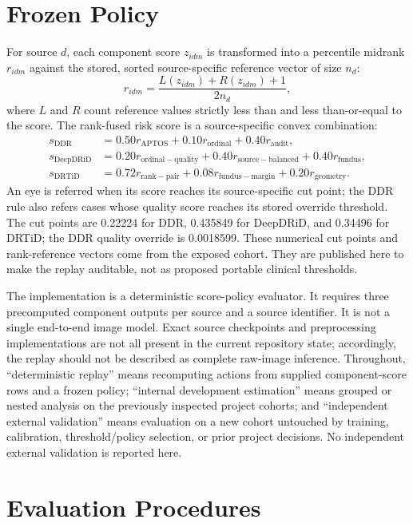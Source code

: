 \documentclass[11pt]{article}
\begin{document}
\section{Frozen Policy}
For source $d$, each component score $z_{idm}$ is transformed into a percentile midrank $r_{idm}$ against the stored, sorted source-specific reference vector of size $n_d$:
\begin{equation}
r_{idm}=\frac{L(z_{idm})+R(z_{idm})+1}{2n_d},
\end{equation}
where $L$ and $R$ count reference values strictly less than and less than-or-equal to the score. The rank-fused risk score is a source-specific convex combination:
\begin{align}
s_{\mathrm{DDR}}&=0.50r_{\mathrm{APTOS}}+0.10r_{\mathrm{ordinal}}+0.40r_{\mathrm{audit}},\\
s_{\mathrm{DeepDRiD}}&=0.20r_{\mathrm{ordinal-quality}}+0.40r_{\mathrm{source-balanced}}+0.40r_{\mathrm{fundus}},\\
s_{\mathrm{DRTiD}}&=0.72r_{\mathrm{rank-pair}}+0.08r_{\mathrm{fundus-margin}}+0.20r_{\mathrm{geometry}}.
\end{align}
An eye is referred when its score reaches its source-specific cut point; the DDR rule also refers cases whose quality score reaches its stored override threshold. The cut points are 0.22224 for DDR, 0.435849 for DeepDRiD, and 0.34496 for DRTiD; the DDR quality override is 0.0018599. These numerical cut points and rank-reference vectors come from the exposed cohort. They are published here to make the replay auditable, not as proposed portable clinical thresholds.

The implementation is a deterministic score-policy evaluator. It requires three precomputed component outputs per source and a source identifier. It is not a single end-to-end image model. Exact source checkpoints and preprocessing implementations are not all present in the current repository state; accordingly, the replay should not be described as complete raw-image inference. Throughout, ``deterministic replay'' means recomputing actions from supplied component-score rows and a frozen policy; ``internal development estimation'' means grouped or nested analysis on the previously inspected project cohorts; and ``independent external validation'' means evaluation on a new cohort untouched by training, calibration, threshold/policy selection, or prior project decisions. No independent external validation is reported here.

\section{Evaluation Procedures}
\end{document}
